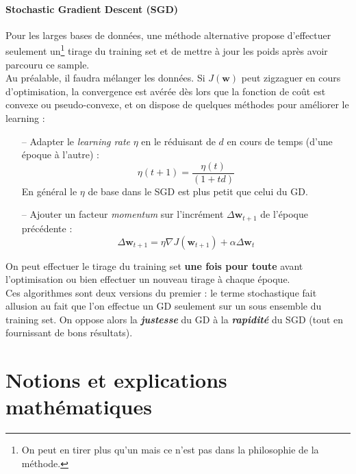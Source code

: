 \documentclass[a4paper,12pt]{report}
\newcommand\bk{\color{black}}
\newcommand\navy{\color{navy}}
\numberwithin{equation}{section} %
\begin{document}
\subsubsection*{Stochastic Gradient Descent (SGD)}
\noindent Pour les larges bases de données, une méthode alternative propose d'effectuer seulement un\footnote{On peut en tirer plus qu'un mais ce n'est pas dans la philosophie de la méthode.} tirage du training set et de mettre à jour les poids après avoir parcouru ce sample. \\ 
Au préalable, il faudra mélanger les données. 
Si $J(\textbf{w})$ peut zigzaguer en cours d'optimisation, la convergence est avérée dès lors que la fonction de coût est convexe ou pseudo-convexe, et on dispose de quelques méthodes pour améliorer le learning :
\begin{itemize}
\item[--] Adapter le \textit{learning rate} $\eta$ en le réduisant de $d$ en cours de temps (d'une époque à l'autre) : 
\begin{equation}
\eta(t+1) = \frac{\eta(t)}{(1 + td)} \label{lr_decay}
\end{equation}
En général le $\eta$ de base dans le SGD est plus petit que celui du GD.
\item[--] Ajouter un facteur \textit{momentum} sur l'incrément $\Delta \textbf{w}_{t+1}$ de l'époque précédente :
\begin{equation}
\Delta \textbf{w}_{t+1} = \eta \nabla J(\textbf{w}_{t+1}) + \alpha \Delta \textbf{w}_t
\end{equation}
\end{itemize}
\noindent On peut effectuer le tirage du training set \textbf{une fois pour toute} avant l'optimisation ou bien effectuer un nouveau tirage à chaque époque.\\

\noindent Ces algorithmes sont deux versions du premier : le terme stochastique fait allusion au fait que l'on effectue un GD seulement sur un sous ensemble du training set. On oppose alors la \textit{\textbf{justesse}} du GD à la \textit{\textbf{rapidité}} du SGD (tout en fournissant de bons résultats).  

\pagebreak

\navy \chapter{Notions et explications mathématiques} \bk
\end{document}
